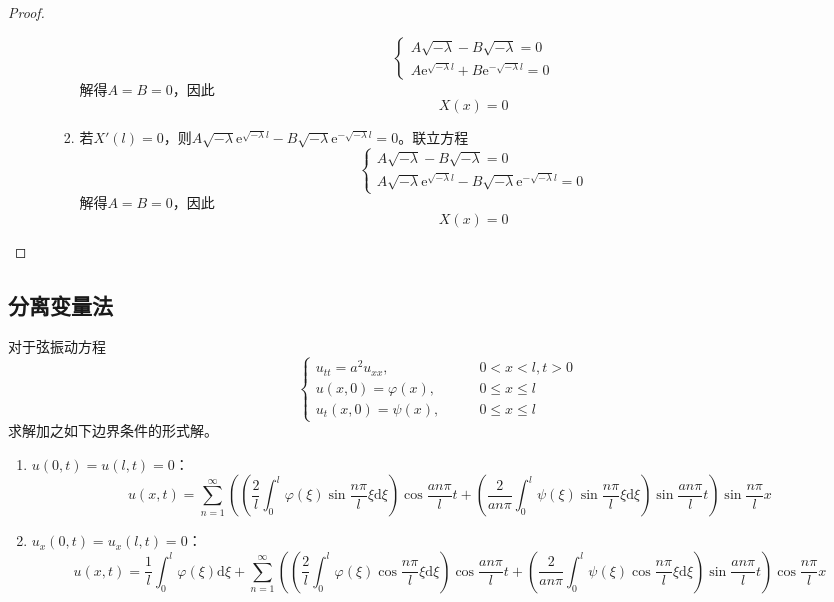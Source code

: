 \documentclass[lang = cn, scheme = chinese, thmcnt = section]{elegantbook}
\newcommand{\dd}{\mathrm{d}}           %
\newcommand{\ee}[1]{\mathrm{e}^{#1}}   %
\begin{document}
\begin{proof}
\begin{enumerate}
\begin{enumerate}
\begin{enumerate}
				$$
				\begin{cases}
					A\sqrt{-\lambda}-B\sqrt{-\lambda}=0\\
					A\ee{\sqrt{-\lambda}l}+B\ee{-\sqrt{-\lambda}l}=0
				\end{cases}
				$$
				解得$A=B=0$，因此
				$$
				X(x)=0
				$$
				\item 若$X'(l)=0$，则$A\sqrt{-\lambda}\ee{\sqrt{-\lambda}l}-B\sqrt{-\lambda}\ee{-\sqrt{-\lambda}l}=0$。联立方程%
				$$
				\begin{cases}
					A\sqrt{-\lambda}-B\sqrt{-\lambda}=0\\
					A\sqrt{-\lambda}\ee{\sqrt{-\lambda}l}-B\sqrt{-\lambda}\ee{-\sqrt{-\lambda}l}=0
				\end{cases}
				$$
				解得$A=B=0$，因此
				$$
				X(x)=0
				$$
			\end{enumerate}
		\end{enumerate}
	\end{enumerate}
\end{proof}

\subsection{分离变量法}

\begin{proposition}
	对于弦振动方程
	$$
	\begin{cases}
		u_{tt}=a^2u_{xx},\qquad & 0<x<l,t>0\\
		u(x,0)=\varphi(x),\qquad & 0\le x\le l\\
		u_t(x,0)=\psi(x),\qquad & 0\le x\le l
	\end{cases}
	$$
	求解加之如下边界条件的形式解。
	\begin{enumerate}
		\item $u(0,t)=u(l,t)=0$：
		$$
		u(x,t)=\sum_{n=1}^{\infty}\left(\left(\frac{2}{l}\int_0^l\varphi(\xi)\sin\frac{n\pi }{l}\xi\dd \xi\right)\cos\frac{an\pi}{l}t+\left(\frac{2}{an\pi}\int_0^l\psi(\xi)\sin\frac{n\pi }{l}\xi\dd \xi\right)\sin \frac{an\pi}{l}t\right)\sin\frac{n\pi}{l}x
		$$
		\item $u_x(0,t)=u_x(l,t)=0$：
		{\scriptsize{
				$$
				u(x,t)=\frac{1}{l}\int_0^l\varphi(\xi)\dd \xi+\sum_{n=1}^{\infty}\left(\left(\frac{2}{l}\int_0^l\varphi(\xi)\cos\frac{n\pi }{l}\xi\dd \xi\right)\cos\frac{an\pi}{l}t+\left(\frac{2}{an\pi}\int_0^l\psi(\xi)\cos\frac{n\pi }{l}\xi\dd \xi\right)\sin \frac{an\pi}{l}t\right)\cos\frac{n\pi}{l}x
				$$
		}}
	\end{enumerate}
\end{proposition}
\end{document}
